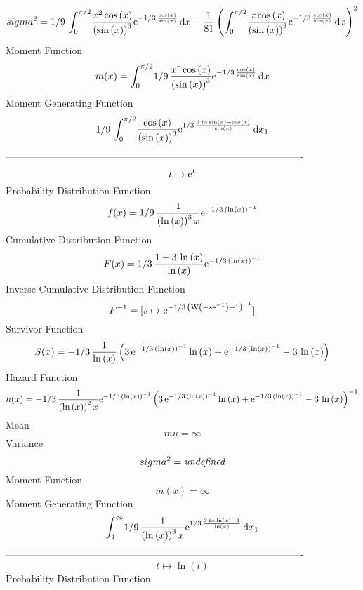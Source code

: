 \documentclass[12pt]{article}
\begin{document}
 $$ sigma^2 = 1/9\,\int_{0}^{\pi/2}\!{\frac {{x}^{2}\cos \left( x \right) }{ \left( 
\sin \left( x \right)  \right) ^{3}}{{\rm e}^{-1/3\,{\frac {\cos
 \left( x \right) }{\sin \left( x \right) }}}}}\,{\rm d}x-{\frac {1}{
81} \left( \int_{0}^{\pi/2}\!{\frac {x\cos \left( x \right) }{ \left( 
\sin \left( x \right)  \right) ^{3}}{{\rm e}^{-1/3\,{\frac {\cos
 \left( x \right) }{\sin \left( x \right) }}}}}\,{\rm d}x \right) ^{2}
}
$$Moment Function 
 $$ m(x) = \int_{0}^{\pi/2}\!1/9\,{\frac {{x}^{r}\cos \left( x \right) }{ \left( 
\sin \left( x \right)  \right) ^{3}}{{\rm e}^{-1/3\,{\frac {\cos
 \left( x \right) }{\sin \left( x \right) }}}}}\,{\rm d}x
$$ Moment Generating Function 
 $$1/9\,\int_{0}^{\pi/2}\!{\frac {\cos \left( x \right) }{ \left( \sin
 \left( x \right)  \right) ^{3}}{{\rm e}^{1/3\,{\frac {3\,tx\sin
 \left( x \right) -\cos \left( x \right) }{\sin \left( x \right) }}}}}
\,{\rm d}x_{{1}}
$$-------------------------------------------------------------------------------------------  \\$$t\mapsto {{\rm e}^{t}}
$$Probability Distribution Function 
$$  f(x)=1/9\,{\frac {1}{ \left( \ln  \left( x \right)  \right) ^{3}x}{{\rm e}^
{-1/3\, \left( \ln  \left( x \right)  \right) ^{-1}}}}
$$Cumulative Distribution Function  
 $$F(x)=1/3\,{\frac {1+3\,\ln  \left( x \right) }{\ln  \left( x \right) }{
{\rm e}^{-1/3\, \left( \ln  \left( x \right)  \right) ^{-1}}}}
$$ Inverse Cumulative Distribution Function 
  $$F^{-1} = [s\mapsto {{\rm e}^{-1/3\, \left( {\rm W} \left(-s{{\rm e}^{-1}}
\right)+1 \right) ^{-1}}}]
$$Survivor Function 
 $$ S(x)=-1/3\,{\frac {1}{\ln  \left( x \right) } \left( 3\,{{\rm e}^{-1/3\,
 \left( \ln  \left( x \right)  \right) ^{-1}}}\ln  \left( x \right) +{
{\rm e}^{-1/3\, \left( \ln  \left( x \right)  \right) ^{-1}}}-3\,\ln 
 \left( x \right)  \right) }
$$ Hazard Function 
 $$ h(x)=-1/3\,{\frac {1}{ \left( \ln  \left( x \right)  \right) ^{2}x}{{\rm e}
^{-1/3\, \left( \ln  \left( x \right)  \right) ^{-1}}} \left( 3\,{
{\rm e}^{-1/3\, \left( \ln  \left( x \right)  \right) ^{-1}}}\ln 
 \left( x \right) +{{\rm e}^{-1/3\, \left( \ln  \left( x \right) 
 \right) ^{-1}}}-3\,\ln  \left( x \right)  \right) ^{-1}}
$$Mean 
 $$ mu=\infty 
$$ Variance 
 $$ sigma^2 = {\it undefined}
$$Moment Function 
 $$ m(x) = \infty 
$$ Moment Generating Function 
 $$\int_{1}^{\infty }\!1/9\,{\frac {1}{ \left( \ln  \left( x \right) 
 \right) ^{3}x}{{\rm e}^{1/3\,{\frac {3\,tx\ln  \left( x \right) -1}{
\ln  \left( x \right) }}}}}\,{\rm d}x_{{1}}
$$-------------------------------------------------------------------------------------------  \\$$t\mapsto \ln  \left( t \right) 
$$Probability Distribution Function 
\end{document}
